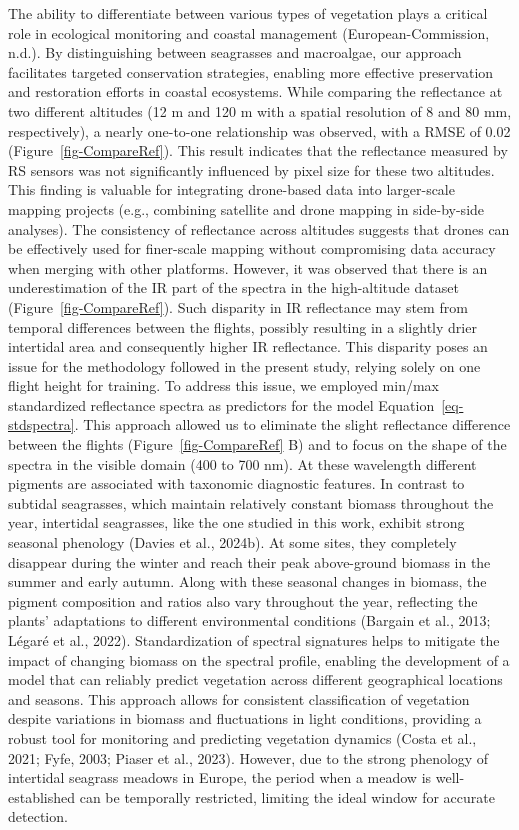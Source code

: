 \documentclass[
  letterpaper,
  11pt,
  english,
  singlespacing,
  headsepline]{MastersDoctoralThesis}
\begin{document}
\begin{spacing}{1.5}
The ability to differentiate between various types of vegetation plays a
critical role in ecological monitoring and coastal management
(European-Commission, n.d.). By distinguishing between seagrasses and
macroalgae, our approach facilitates targeted conservation strategies,
enabling more effective preservation and restoration efforts in coastal
ecosystems. While comparing the reflectance at two different altitudes
(12 m and 120 m with a spatial resolution of 8 and 80 mm, respectively),
a nearly one-to-one relationship was observed, with a RMSE of 0.02
(Figure~\ref{fig-CompareRef}). This result indicates that the
reflectance measured by RS sensors was not significantly influenced by
pixel size for these two altitudes. This finding is valuable for
integrating drone-based data into larger-scale mapping projects (e.g.,
combining satellite and drone mapping in side-by-side analyses). The
consistency of reflectance across altitudes suggests that drones can be
effectively used for finer-scale mapping without compromising data
accuracy when merging with other platforms. However, it was observed
that there is an underestimation of the IR part of the spectra in the
high-altitude dataset (Figure~\ref{fig-CompareRef}). Such disparity in
IR reflectance may stem from temporal differences between the flights,
possibly resulting in a slightly drier intertidal area and consequently
higher IR reflectance. This disparity poses an issue for the methodology
followed in the present study, relying solely on one flight height for
training. To address this issue, we employed min/max standardized
reflectance spectra as predictors for the model
Equation~\ref{eq-stdspectra}. This approach allowed us to eliminate the
slight reflectance difference between the flights
(Figure~\ref{fig-CompareRef} B) and to focus on the shape of the spectra
in the visible domain (400 to 700 nm). At these wavelength different
pigments are associated with taxonomic diagnostic features. In contrast
to subtidal seagrasses, which maintain relatively constant biomass
throughout the year, intertidal seagrasses, like the one studied in this
work, exhibit strong seasonal phenology (Davies et al., 2024b). At some
sites, they completely disappear during the winter and reach their peak
above-ground biomass in the summer and early autumn. Along with these
seasonal changes in biomass, the pigment composition and ratios also
vary throughout the year, reflecting the plants' adaptations to
different environmental conditions (Bargain et al., 2013; Légaré et al.,
2022). Standardization of spectral signatures helps to mitigate the
impact of changing biomass on the spectral profile, enabling the
development of a model that can reliably predict vegetation across
different geographical locations and seasons. This approach allows for
consistent classification of vegetation despite variations in biomass
and fluctuations in light conditions, providing a robust tool for
monitoring and predicting vegetation dynamics (Costa et al., 2021; Fyfe,
2003; Piaser et al., 2023). However, due to the strong phenology of
intertidal seagrass meadows in Europe, the period when a meadow is
well-established can be temporally restricted, limiting the ideal window
for accurate detection.


\end{spacing}
\end{document}
